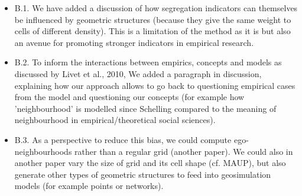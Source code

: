 \documentclass[11pt,a4paper,sans]{moderncv}        %
\begin{document}
 \begin{itemize}
 
  \item B.1. We have added a discussion of how segregation indicators can themselves be influenced by geometric structures (because they give the same weight to cells of different density). This is a limitation of the method as it is but also an avenue for promoting stronger indicators in empirical research. %
  
  \item B.2. To inform the interactions between empirics, concepts and models as discussed by Livet et al., 2010, We added a paragraph in discussion, explaining how our approach allows to go back to questioning empirical cases from the model and questioning our concepts (for example how 'neighbourhood' is modelled since Schelling compared to the meaning of neighbourhood in empirical/theoretical social sciences). 
  
  \item B.3. As a perspective to reduce this bias, we could compute ego-neighbourhoods rather than a regular grid (another paper). We could also in another paper vary the size of grid and its cell shape (cf. MAUP), but also generate other types of geometric structures to feed into geosimulation models (for example points or networks). %
\end{itemize}

\bigskip


 
  
\end{document}
